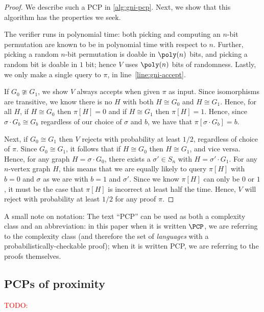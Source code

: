 \documentclass[english,12pt]{reedthesis}
\theoremstyle{plain}
\theoremstyle{definition}
\theoremstyle{remark}
\newcommand{\TODO}[1]{\textcolor{red}{TODO: #1}}
\begin{document}
\begin{proof} %
  We describe such a PCP in \cref{alg:gni-pcp}. Next, we show that this
  algorithm has the properties we seek.

  The verifier runs in polynomial time: both picking and computing an $n$-bit
  permutation are known to be in polynomial time with respect to $n$. Further,
  picking a random $n$-bit permutation is doable in $\poly(n)$ bits, and picking
  a random bit is doable in $1$ bit; hence $V$ uses $\poly(n)$ bits of
  randomness. Lastly, we only make a single query to $\pi$, in
  line~\ref{line:gni-accept}.

  If $G_{0} \ncong G_{1}$, we show $V$ always accepts when given $\pi$ as input. Since
  isomorphisms are transitive, we know there is no $H$ with both $H \cong G_{0}$ and
  $H \cong G_{1}$. Hence, for all $H$, if $H \cong G_{0}$ then $\pi[H] = 0$ and if
  $H \cong G_{1}$ then $\pi[H] = 1$. Hence, since $\sigma \cdot G_{b} \cong G_{b}$ regardless of
  our choice of $\sigma$ and $b$, we have that $\pi[\sigma \cdot G_{b}] = b$.

  Next, if $G_{0} \cong G_{1}$ then $V$ rejects with probability at least $1/2$,
  regardless of choice of $\pi$. Since $G_{0} \cong G_{1}$, it follows that if
  $H \cong G_{0}$ then $H \cong G_{1}$, and vice versa. Hence, for any graph
  $H = \sigma \cdot G_{0}$, there exists a $\sigma' \in S_{n}$ with $H = \sigma' \cdot G_{1}$. For any
  $n$-vertex graph $H$, this means that we are equally likely to query $\pi[H]$
  with $b = 0$ and $\sigma$ as we are with $b = 1$ and $\sigma'$. Since we know $\pi[H]$ can
  only be $0$ or $1$, it must be the case that $\pi[H]$ is incorrect at least half
  the time. Hence, $V$ will reject with probability at least $1/2$ for any proof
  $\pi$.
\end{proof}

A small note on notation: The text ``PCP'' can be used as both a complexity
class and an abbreviation: in this paper when it is written $\PCP$, we are
referring to the complexity class (and therefore the set of \emph{languages}
with a probabilistically-checkable proof); when it is written PCP, we are
referring to the proofs themselves.

\subsection{PCPs of proximity}\label{sec:pcpp}

\TODO{}
\end{document}
